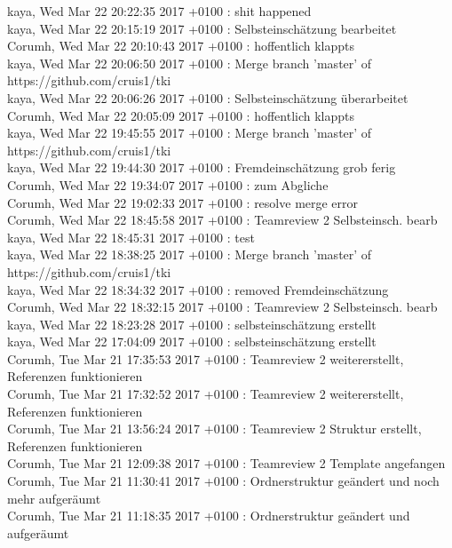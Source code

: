kaya, Wed Mar 22 20:22:35 2017 +0100 : shit happened\\
kaya, Wed Mar 22 20:15:19 2017 +0100 : Selbsteinschätzung bearbeitet\\
Corumh, Wed Mar 22 20:10:43 2017 +0100 : hoffentlich klappts\\
kaya, Wed Mar 22 20:06:50 2017 +0100 : Merge branch 'master' of https://github.com/cruis1/tki\\
kaya, Wed Mar 22 20:06:26 2017 +0100 : Selbsteinschätzung überarbeitet\\
Corumh, Wed Mar 22 20:05:09 2017 +0100 : hoffentlich klappts\\
kaya, Wed Mar 22 19:45:55 2017 +0100 : Merge branch 'master' of https://github.com/cruis1/tki\\
kaya, Wed Mar 22 19:44:30 2017 +0100 : Fremdeinschätzung grob ferig\\
Corumh, Wed Mar 22 19:34:07 2017 +0100 : zum Abgliche\\
Corumh, Wed Mar 22 19:02:33 2017 +0100 : resolve merge error\\
Corumh, Wed Mar 22 18:45:58 2017 +0100 : Teamreview 2 Selbsteinsch. bearb\\
kaya, Wed Mar 22 18:45:31 2017 +0100 : test\\
kaya, Wed Mar 22 18:38:25 2017 +0100 : Merge branch 'master' of https://github.com/cruis1/tki\\
kaya, Wed Mar 22 18:34:32 2017 +0100 : removed Fremdeinschätzung\\
Corumh, Wed Mar 22 18:32:15 2017 +0100 : Teamreview 2 Selbsteinsch. bearb\\
kaya, Wed Mar 22 18:23:28 2017 +0100 : selbsteinschätzung erstellt\\
kaya, Wed Mar 22 17:04:09 2017 +0100 : selbsteinschätzung erstellt\\
Corumh, Tue Mar 21 17:35:53 2017 +0100 : Teamreview 2 weitererstellt, Referenzen funktionieren\\
Corumh, Tue Mar 21 17:32:52 2017 +0100 : Teamreview 2 weitererstellt, Referenzen funktionieren\\
Corumh, Tue Mar 21 13:56:24 2017 +0100 : Teamreview 2 Struktur erstellt, Referenzen funktionieren\\
Corumh, Tue Mar 21 12:09:38 2017 +0100 : Teamreview 2 Template angefangen\\
Corumh, Tue Mar 21 11:30:41 2017 +0100 : Ordnerstruktur geändert und noch mehr aufgeräumt\\
Corumh, Tue Mar 21 11:18:35 2017 +0100 : Ordnerstruktur geändert und aufgeräumt\\
